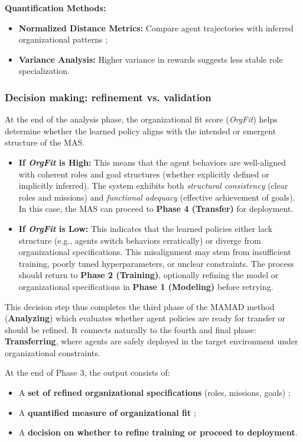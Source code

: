 \documentclass[pdflatex,sn-mathphys-num]{sn-jnl}%
\theoremstyle{thmstyleone}%
\theoremstyle{thmstyletwo}%
\theoremstyle{thmstylethree}%
\begin{document}
\noindent \textbf{Quantification Methods:}
\begin{itemize}
    \item \textbf{Normalized Distance Metrics:} Compare agent trajectories with inferred organizational patterns ;
    \item \textbf{Variance Analysis:} Higher variance in rewards suggests less stable role specialization.
\end{itemize}

\subsubsection{Decision making: refinement vs. validation}

At the end of the analysis phase, the organizational fit score (\textit{OrgFit}) helps determine whether the learned policy aligns with the intended or emergent structure of the MAS.

\begin{itemize}
    \item \textbf{If \textit{OrgFit} is High:} This means that the agent behaviors are well-aligned with coherent roles and goal structures (whether explicitly defined or implicitly inferred). The system exhibits both \textit{structural consistency} (clear roles and missions) and \textit{functional adequacy} (effective achievement of goals). In this case, the MAS can proceed to \textbf{Phase 4 (Transfer)} for deployment.
          
    \item \textbf{If \textit{OrgFit} is Low:} This indicates that the learned policies either lack structure (e.g., agents switch behaviors erratically) or diverge from organizational specifications. This misalignment may stem from insufficient training, poorly tuned hyperparameters, or unclear constraints. The process should return to \textbf{Phase 2 (Training)}, optionally refining the model or organizational specifications in \textbf{Phase 1 (Modeling)} before retrying.
\end{itemize}

\noindent This decision step thus completes the third phase of the MAMAD method (\textbf{Analyzing}) which evaluates whether agent policies are ready for transfer or should be refined. It connects naturally to the fourth and final phase: \textbf{Transferring}, where agents are safely deployed in the target environment under organizational constraints.

At the end of Phase 3, the output consists of:
\begin{itemize}
    \item A \textbf{set of refined organizational specifications} (roles, missions, goals) ;
    \item A \textbf{quantified measure of organizational fit} ;
    \item A \textbf{decision on whether to refine training or proceed to deployment}.
\end{itemize}
\end{document}
